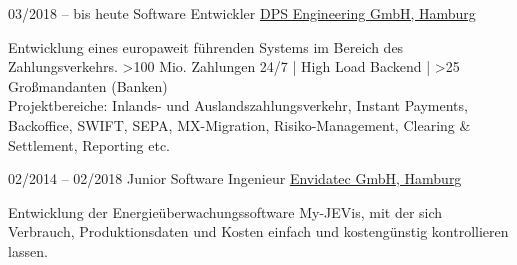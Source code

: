 




\begin{minipage}[t]{\textwidth}
\begin{entrylist}
  \entry
  {03/2018 -- bis heute}
  {Software Entwickler}
  {\href{https://dps.de/}{DPS Engineering GmbH, Hamburg}}
  {Entwicklung eines europaweit führenden Systems im Bereich des Zahlungsverkehrs. >100 Mio. Zahlungen
24/7 | High Load Backend | >25 Großmandanten (Banken)\\
Projektbereiche: Inlands- und Auslandszahlungsverkehr, Instant Payments,
Backoffice, SWIFT, SEPA, MX-Migration, Risiko-Management, Clearing \&
Settlement, Reporting etc.

  }
  \entry
  {02/2014 -- 02/2018}
  {Junior Software Ingenieur}
  {\href{https://envidatec.com/en/}{Envidatec GmbH, Hamburg}}
  { Entwicklung der Energieüberwachungssoftware My-JEVis, mit der sich Verbrauch, Produktionsdaten und Kosten einfach und kostengünstig kontrollieren lassen.

  }
\end{entrylist}
\end{minipage}
